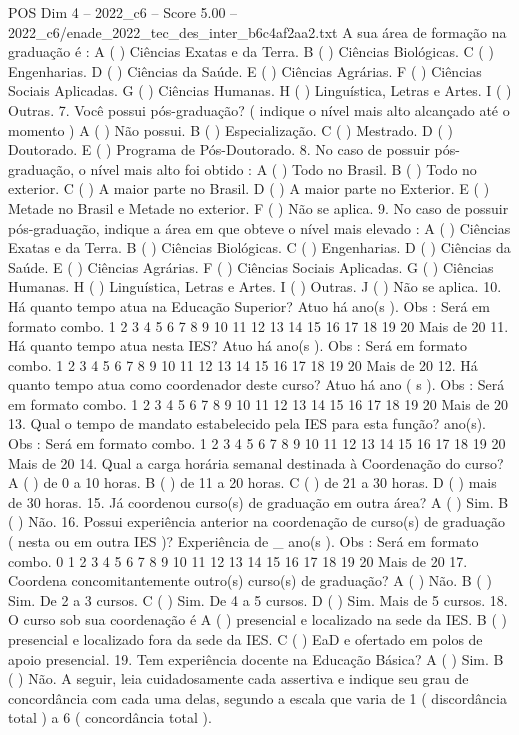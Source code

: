 \begin{textsample}{POS Dim 4 – 2022\_c6 – Score 5.00 – 2022\_c6/enade\_2022\_tec\_des\_inter\_b6c4af2aa2.txt}
A sua área de formação na graduação é : A ( ) Ciências Exatas e da Terra.
B ( ) Ciências Biológicas.
C ( ) Engenharias.
D ( ) Ciências da Saúde.
E ( ) Ciências Agrárias.
F ( ) Ciências Sociais Aplicadas.
G ( ) Ciências Humanas.
H ( ) Linguística, Letras e Artes.
I ( ) Outras. 7.
Você possui pós-graduação? ( indique o nível mais alto alcançado até o momento ) A ( ) Não possui.
B ( ) Especialização.
C ( ) Mestrado.
D ( ) Doutorado.
E ( ) Programa de Pós-Doutorado. 8.
No caso de possuir pós-graduação, o nível mais alto foi obtido : A ( ) Todo no Brasil.
B ( ) Todo no exterior.
C ( ) A maior parte no Brasil.
D ( ) A maior parte no Exterior.
E ( ) Metade no Brasil e Metade no exterior.
F ( ) Não se aplica. 9.
No caso de possuir pós-graduação, indique a área em que obteve o nível mais elevado : A ( ) Ciências Exatas e da Terra.
B ( ) Ciências Biológicas.
C ( ) Engenharias.
D ( ) Ciências da Saúde.
E ( ) Ciências Agrárias.
F ( ) Ciências Sociais Aplicadas.
G ( ) Ciências Humanas.
H ( ) Linguística, Letras e Artes.
I ( ) Outras.
J ( ) Não se aplica. 10.
Há quanto tempo atua na Educação Superior?
Atuo há ano(s ).
Obs : Será em formato combo. 1 2 3 4 5 6 7 8 9 10 11 12 13 14 15 16 17 18 19 20 Mais de 20 11.
Há quanto tempo atua nesta IES?
Atuo há ano(s ).
Obs : Será em formato combo. 1 2 3 4 5 6 7 8 9 10 11 12 13 14 15 16 17 18 19 20 Mais de 20 12.
Há quanto tempo atua como coordenador deste curso?
Atuo há ano ( s ).
Obs : Será em formato combo. 1 2 3 4 5 6 7 8 9 10 11 12 13 14 15 16 17 18 19 20 Mais de 20 13.
Qual o tempo de mandato estabelecido pela IES para esta função? ano(s).
Obs : Será em formato combo. 1 2 3 4 5 6 7 8 9 10 11 12 13 14 15 16 17 18 19 20 Mais de 20 14.
Qual a carga horária semanal destinada à Coordenação do curso?
A ( ) de 0 a 10 horas.
B ( ) de 11 a 20 horas.
C ( ) de 21 a 30 horas.
D ( ) mais de 30 horas. 15.
Já coordenou curso(s) de graduação em outra área?
A ( ) Sim.
B ( ) Não. 16.
Possui experiência anterior na coordenação de curso(s) de graduação ( nesta ou em outra IES )?
Experiência de \_ ano(s ).
Obs : Será em formato combo. 0 1 2 3 4 5 6 7 8 9 10 11 12 13 14 15 16 17 18 19 20 Mais de 20 17.
Coordena concomitantemente outro(s) curso(s) de graduação?
A ( ) Não.
B ( ) Sim.
De 2 a 3 cursos.
C ( ) Sim.
De 4 a 5 cursos.
D ( ) Sim.
Mais de 5 cursos. 18.
O curso sob sua coordenação é A ( ) presencial e localizado na sede da IES.
B ( ) presencial e localizado fora da sede da IES.
C ( ) EaD e ofertado em polos de apoio presencial. 19.
Tem experiência docente na Educação Básica?
A ( ) Sim.
B ( ) Não.
A seguir, leia cuidadosamente cada assertiva e indique seu grau de concordância com cada uma delas, segundo a escala que varia de 1 ( discordância total ) a 6 ( concordância total ).

\end{textsample}
